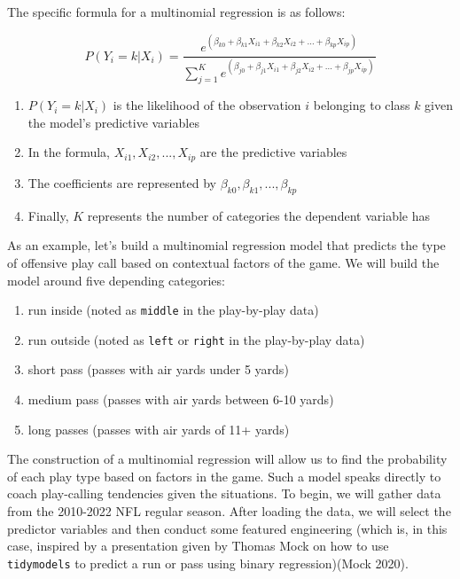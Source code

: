 \documentclass[
  letterpaper,
]{krantz}
\providecommand{\tightlist}{%
  \setlength{\itemsep}{0pt}\setlength{\parskip}{0pt}}\usepackage{longtable,booktabs,array}
\begin{document}
The specific formula for a multinomial regression is as follows:

\[
P(Y_{i} = k | X_{i}) = \frac{e^{(\beta_{k0} + \beta_{k1}X_{i1} + \beta_{k2}X_{i2} + … + \beta_{kp}X_{ip})}}{\sum_{j=1}^{K} e^{(\beta_{j0} + \beta_{j1}X_{i1} + \beta_{j2}X_{i2} + … + \beta_{jp}X_{ip})}}
\]

\begin{enumerate}
\def\labelenumi{\arabic{enumi}.}
\tightlist
\item
  \(P(Y_{i} = k | X_{i})\) is the likelihood of the observation \(i\)
  belonging to class \(k\) given the model's predictive variables
\item
  In the formula, \(X_{i1}, X_{i2}, ..., X_{ip}\) are the predictive
  variables
\item
  The coefficients are represented by
  \(\beta_{k0}, \beta_{k1}, ...,\beta_{kp}\)
\item
  Finally, \(K\) represents the number of categories the dependent
  variable has
\end{enumerate}

As an example, let's build a multinomial regression model that predicts
the type of offensive play call based on contextual factors of the game.
We will build the model around five depending categories:

\begin{enumerate}
\def\labelenumi{\arabic{enumi}.}
\tightlist
\item
  run inside (noted as \texttt{middle} in the play-by-play data)
\item
  run outside (noted as \texttt{left} or \texttt{right} in the
  play-by-play data)
\item
  short pass (passes with air yards under 5 yards)
\item
  medium pass (passes with air yards between 6-10 yards)
\item
  long passes (passes with air yards of 11+ yards)
\end{enumerate}

The construction of a multinomial regression will allow us to find the
probability of each play type based on factors in the game. Such a model
speaks directly to coach play-calling tendencies given the situations.
To begin, we will gather data from the 2010-2022 NFL regular season.
After loading the data, we will select the predictor variables and then
conduct some featured engineering (which is, in this case, inspired by a
presentation given by Thomas Mock on how to use \texttt{tidymodels} to
predict a run or pass using binary regression)(Mock 2020).
\end{document}

